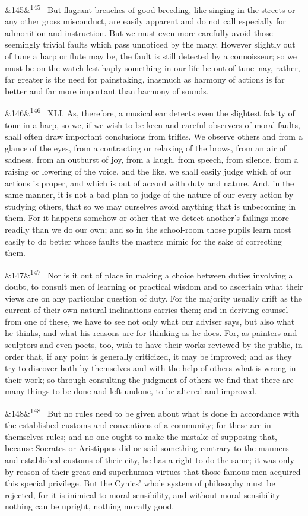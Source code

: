 \documentclass[12pt]{article}
\newcommand{\para}[1][]{\par\noindent\ifx&#1&\else\textsuperscript{\footnotesize #1}~\fi}
\begin{document}
\para[145] But flagrant breaches of good breeding, like singing in the streets or any other gross misconduct, are easily apparent and do not call especially for admonition and instruction. But we must even more carefully avoid those seemingly trivial faults which pass unnoticed by the many. However slightly out of tune a harp or flute may be, the fault is still detected by a connoisseur; so we must be on the watch lest haply something in our life be out of tune--nay, rather, far greater is the need for painstaking, inasmuch as harmony of actions is far better and far more important than harmony of sounds.

\para[146] XLI. As, therefore, a musical ear detects even the slightest falsity of tone in a harp, so we, if we wish to be keen and careful observers of moral faults, shall often draw important conclusions from trifles. We observe others and from a glance of the eyes, from a contracting or relaxing of the brows, from an air of sadness, from an outburst of joy, from a laugh, from speech, from silence, from a raising or lowering of the voice, and the like, we shall easily judge which of our actions is proper, and which is out of accord with duty and nature. And, in the same manner, it is not a bad plan to judge of the nature of our every action by studying others, that so we may ourselves avoid anything that is unbecoming in them. For it happens somehow or other that we detect another's failings more readily than we do our own; and so in the school-room those pupils learn most easily to do better whose faults the masters mimic for the sake of correcting them.

\para[147] Nor is it out of place in making a choice between duties involving a doubt, to consult men of learning or practical wisdom and to ascertain what their views are on any particular question of duty. For the majority usually drift as the current of their own natural inclinations carries them; and in deriving counsel from one of these, we have to see not only what our adviser says, but also what he thinks, and what his reasons are for thinking as he does. For, as painters and sculptors and even poets, too, wish to have their works reviewed by the public, in order that, if any point is generally criticized, it may be improved; and as they try to discover both by themselves and with the help of others what is wrong in their work; so through consulting the judgment of others we find that there are many things to be done and left undone, to be altered and improved.

\para[148] But no rules need to be given about what is done in accordance with the established customs and conventions of a community; for these are in themselves rules; and no one ought to make the mistake of supposing that, because Socrates or Aristippus did or said something contrary to the manners and established customs of their city, he has a right to do the same; it was only by reason of their great and superhuman virtues that those famous men acquired this special privilege. But the Cynics' whole system of philosophy must be rejected, for it is inimical to moral sensibility, and without moral sensibility nothing can be upright, nothing morally good.
\end{document}

